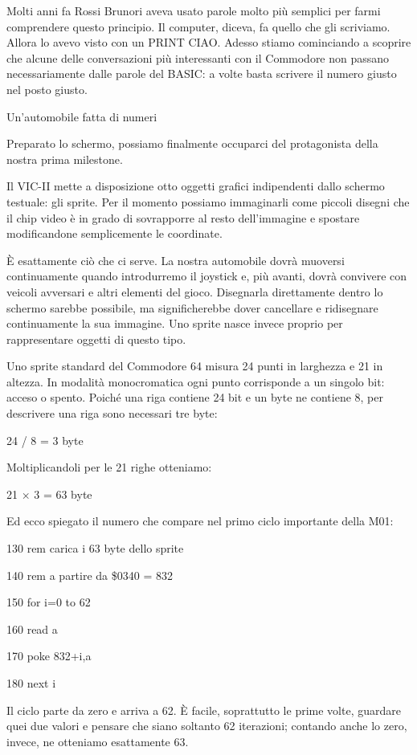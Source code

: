 \documentclass{article}
\begin{document}
Molti anni fa Rossi Brunori aveva usato parole molto più semplici per farmi comprendere questo principio. Il computer,
diceva, fa quello che gli scriviamo. Allora lo avevo visto con un PRINT {\textquotedbl}CIAO{\textquotedbl}. Adesso
stiamo cominciando a scoprire che alcune delle conversazioni più interessanti con il Commodore non passano
necessariamente dalle parole del BASIC: a volte basta scrivere il numero giusto nel posto giusto.

Un'automobile fatta di numeri

Preparato lo schermo, possiamo finalmente occuparci del protagonista della nostra prima milestone.

Il VIC-II mette a disposizione otto oggetti grafici indipendenti dallo schermo testuale: gli sprite. Per il momento
possiamo immaginarli come piccoli disegni che il chip video è in grado di sovrapporre al resto dell'immagine e spostare
modificandone semplicemente le coordinate.

È esattamente ciò che ci serve. La nostra automobile dovrà muoversi continuamente quando introdurremo il joystick e, più
avanti, dovrà convivere con veicoli avversari e altri elementi del gioco. Disegnarla direttamente dentro lo schermo
sarebbe possibile, ma significherebbe dover cancellare e ridisegnare continuamente la sua immagine. Uno sprite nasce
invece proprio per rappresentare oggetti di questo tipo.

Uno sprite standard del Commodore 64 misura 24 punti in larghezza e 21 in altezza. In modalità monocromatica ogni punto
corrisponde a un singolo bit: acceso o spento. Poiché una riga contiene 24 bit e un byte ne contiene 8, per descrivere
una riga sono necessari tre byte:

24 / 8 = 3 byte

Moltiplicandoli per le 21 righe otteniamo:

21 × 3 = 63 byte

Ed ecco spiegato il numero che compare nel primo ciclo importante della M01:

130 rem carica i 63 byte dello sprite

140 rem a partire da \$0340 = 832

150 for i=0 to 62

160 read a

170 poke 832+i,a

180 next i

Il ciclo parte da zero e arriva a 62. È facile, soprattutto le prime volte, guardare quei due valori e pensare che siano
soltanto 62 iterazioni; contando anche lo zero, invece, ne otteniamo esattamente 63.
\end{document}
